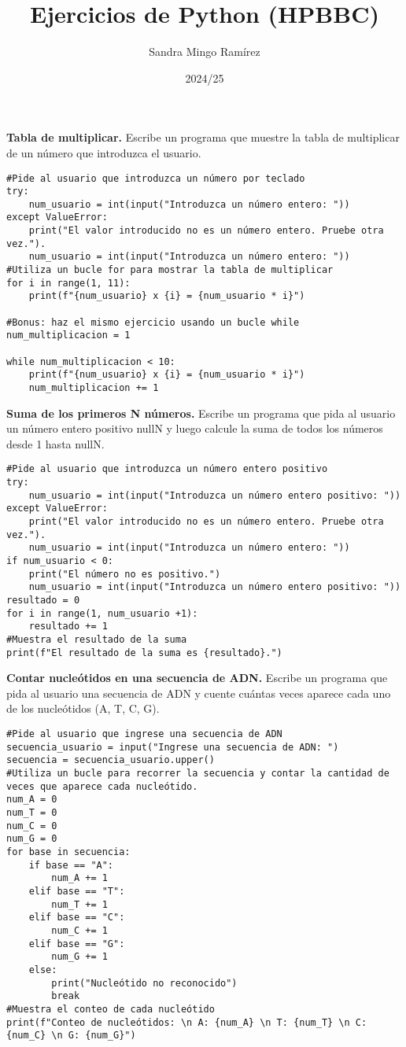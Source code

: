 \documentclass{config/ejercicios}
\title{Ejercicios de Python (HPBBC)}
\author{Sandra Mingo Ramírez}
\date{2024/25}
\begin{document}
\maketitle

\begin{problemS} \textbf{Tabla de multiplicar.}
Escribe un programa que muestre la tabla de multiplicar de un número que introduzca el usuario.
\begin{lstlisting}
#Pide al usuario que introduzca un número por teclado
try:
	num_usuario = int(input("Introduzca un número entero: "))
except ValueError:
	print("El valor introducido no es un número entero. Pruebe otra vez.").
	num_usuario = int(input("Introduzca un número entero: "))
#Utiliza un bucle for para mostrar la tabla de multiplicar
for i in range(1, 11):
	print(f"{num_usuario} x {i} = {num_usuario * i}")
	
#Bonus: haz el mismo ejercicio usando un bucle while
num_multiplicacion = 1

while num_multiplicacion < 10:
	print(f"{num_usuario} x {i} = {num_usuario * i}")
	num_multiplicacion += 1
\end{lstlisting}
\end{problemS}

\begin{problemS} \textbf{Suma de los primeros N números.}
Escribe un programa que pida al usuario un número entero positivo nullN y luego calcule la suma de todos los números desde 1 hasta nullN.
\begin{lstlisting}
#Pide al usuario que introduzca un número entero positivo
try:
	num_usuario = int(input("Introduzca un número entero positivo: "))
except ValueError:
	print("El valor introducido no es un número entero. Pruebe otra vez.").
	num_usuario = int(input("Introduzca un número entero: "))
if num_usuario < 0:
	print("El número no es positivo.")
	num_usuario = int(input("Introduzca un número entero positivo: "))
resultado = 0
for i in range(1, num_usuario +1):
	resultado += 1
#Muestra el resultado de la suma
print(f"El resultado de la suma es {resultado}.")
\end{lstlisting}
\end{problemS}

\begin{problemS} \textbf{Contar nucleótidos en una secuencia de ADN.}
Escribe un programa que pida al usuario una secuencia de ADN y cuente cuántas veces aparece cada uno de los nucleótidos (A, T, C, G).
\begin{lstlisting}
#Pide al usuario que ingrese una secuencia de ADN
secuencia_usuario = input("Ingrese una secuencia de ADN: ")
secuencia = secuencia_usuario.upper()
#Utiliza un bucle para recorrer la secuencia y contar la cantidad de veces que aparece cada nucleótido.
num_A = 0
num_T = 0
num_C = 0
num_G = 0
for base in secuencia:
	if base == "A":
		num_A += 1
	elif base == "T":
		num_T += 1
	elif base == "C":
		num_C += 1
	elif base == "G":
		num_G += 1
	else:
		print("Nucleótido no reconocido")
		break
#Muestra el conteo de cada nucleótido
print(f"Conteo de nucleótidos: \n A: {num_A} \n T: {num_T} \n C: {num_C} \n G: {num_G}")
\end{lstlisting}
\end{problemS}
\end{document}
